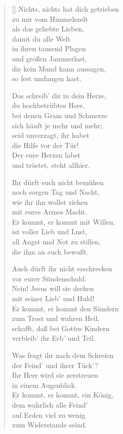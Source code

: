 \documentclass[fontsize=11pt]{scrartcl}
\begin{document}
\begin{multicols}{2}
\begin{verse}[\versewidth]
   Nichts, nichts hat dich getrieben\\
  zu mir vom Himmelszelt\\
  als das geliebte Lieben,\\
  damit du alle Welt\\
  in ihren tausend Plagen\\
  und großen Jammerlast,\\
  die kein Mund kann aussagen,\\
  so fest umfangen hast.

   Das schreib' dir in dein Herze,\\
  du hochbetrübtes Heer,\\
  bei denen Gram und Schmerze\\
  sich häuft je mehr und mehr;\\
  seid unverzagt, ihr habet\\
  die Hilfe vor der Tür!\\
  Der eure Herzen labet\\
  und tröstet, steht allhier.

   Ihr dürft euch nicht bemühen\\
  noch sorgen Tag und Nacht,\\
  wie ihr ihn wollet ziehen\\
  mit eures Armes Macht.\\
  Er kommt, er kommt mit Willen,\\
  ist voller Lieb und Lust,\\
  all Angst und Not zu stillen,\\
  die ihm an euch bewußt.

   Auch dürft ihr nicht erschrecken\\
  vor eurer Sündenschuld.\\
  Nein! Jesus will sie decken\\
  mit seiner Lieb' und Huld!\\
  Er kommt, er kommt den Sündern\\
  zum Trost und wahren Heil,\\
  schafft, daß bei Gottes Kindern\\
  verbleib' ihr Erb' und Teil.

   Was fragt ihr nach dem Schreien\\
  der Feind' und ihrer Tück'?\\
  Ihr Herr wird sie zerstreuen\\%
  in einem Augenblick.\\
  Er kommt, er kommt, ein König,\\
  dem wahrlich alle Feind'\\
  auf Erden viel zu wenig\\
  zum Widerstande seind.


\end{verse}
\end{multicols}
\end{document}

